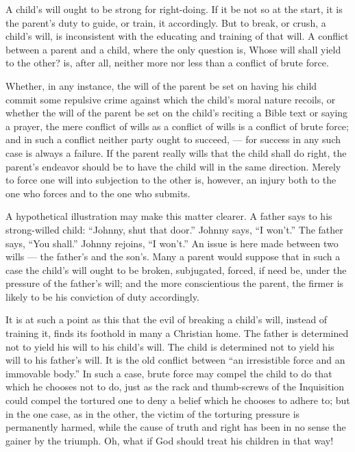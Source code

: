 \documentclass[
]{book}
\begin{document}
A child's will ought to be strong for right-doing. If it be not so at the start, it is the parent's duty to guide, or train, it accordingly. But to break, or crush, a child's will, is inconsistent with the educating and training of that will. A conflict between a parent and a child, where the only question is, Whose will shall yield to the other? is, after all, neither more nor less than a conflict of brute force.

Whether, in any instance, the will of the parent be set on having his child commit some repulsive crime against which the child's moral nature recoils, or whether the will of the parent be set on the child's reciting a Bible text or saying a prayer, the mere conflict of wills as a conflict of wills is a conflict of brute force; and in such a conflict neither party ought to succeed, --- for success in any such case is always a failure. If the parent really wills that the child shall do right, the parent's endeavor should be to have the child will in the same direction. Merely to force one will into subjection to the other is, however, an injury both to the one who forces and to the one who submits.

A hypothetical illustration may make this matter clearer. A father says to his strong-willed child: ``Johnny, shut that door.'' Johnny says, ``I won't.'' The father says, ``You shall.'' Johnny rejoins, ``I won't.'' An issue is here made between two wills --- the father's and the son's. Many a parent would suppose that in such a case the child's will ought to be broken, subjugated, forced, if need be, under the pressure of the father's will; and the more conscientious the parent, the firmer is likely to be his conviction of duty accordingly.

It is at such a point as this that the evil of breaking a child's will, instead of training it, finds its foothold in many a Christian home. The father is determined not to yield his will to his child's will. The child is determined not to yield his will to his father's will. It is the old conflict between ``an irresistible force and an immovable body.'' In such a case, brute force may compel the child to do that which he chooses not to do, just as the rack and thumb-screws of the Inquisition could compel the tortured one to deny a belief which he chooses to adhere to; but in the one case, as in the other, the victim of the torturing pressure is permanently harmed, while the cause of truth and right has been in no sense the gainer by the triumph. Oh, what if God should treat his children in that way!
\end{document}
